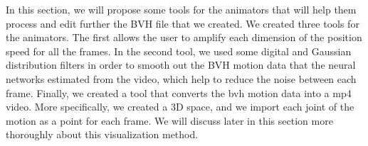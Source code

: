 In this section, we will propose some tools for the animators that will help them process and edit further the BVH file that we created. We created three tools for the animators. The first allows the user to amplify each dimension of the position speed for all the frames. In the second tool, we used some digital and Gaussian distribution filters in order to smooth out the BVH motion data that the neural networks estimated from the video, which help to reduce the noise between each frame. Finally, we created a tool that converts the bvh motion data into a mp4 video. More specifically, we created a 3D space, and we import each joint of the motion as a point for each frame. We will discuss later in this section more thoroughly about this visualization method.